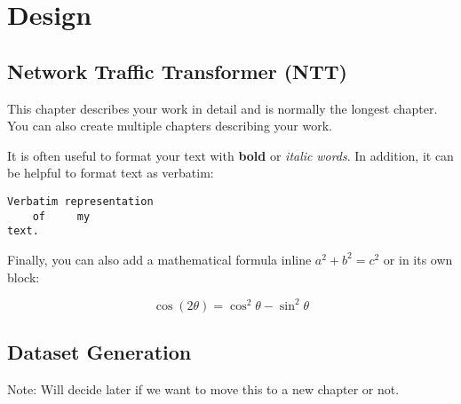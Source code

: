 \chapter{Design}
\label{cha:design}

\section{Network Traffic Transformer (NTT)}
\label{sec:ntt}

This chapter describes your work in detail and is normally the longest chapter.
You can also create multiple chapters describing your work.

It is often useful to format your text with \textbf{bold} or \textit{italic}
\emph{words}. In addition, it can be helpful to format text as verbatim:

\begin{verbatim}
Verbatim representation
    of     my
text.
\end{verbatim}

Finally, you can also add a mathematical formula inline $a^2 + b^2 = c^2$ or in
its own block:

\begin{equation}
    \cos (2\theta) = \cos^2 \theta - \sin^2 \theta
\end{equation}

\section{Dataset Generation}
\label{sec:ns3}

Note: Will decide later if we want to move this to a new chapter or not.